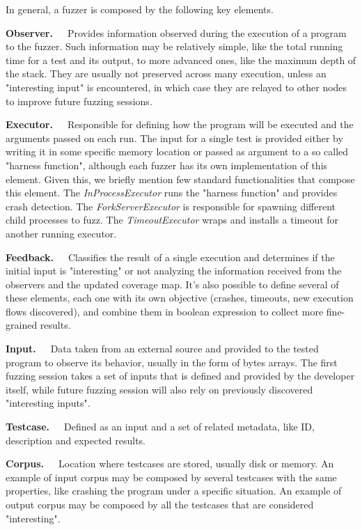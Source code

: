 In general, a fuzzer is composed by the following key elements. \cite{afl_docs}

\textbf{Observer.}\ \ \ Provides information observed during the execution of a program to the fuzzer. Such information may be relatively simple, like the total running time for a test and its output, to more advanced ones, like the maximum depth of the stack. They are usually not preserved across many execution, unless an "interesting input" is encountered, in which case they are relayed to other nodes to improve future fuzzing sessions. 

\textbf{Executor.}\ \ \ Responsible for defining how the program will be executed and the arguments passed on each run. The input for a single test is provided either by writing it in some specific memory location or passed as argument to a so called "harness function", although each fuzzer has its own implementation of this element. Given this, we briefly mention few standard functionalities that compose this element. The \textit{InProcessExecutor} runs the "harness function" and provides crash detection. The \textit{ForkServerExecutor} is responsible for spawning different child processes to fuzz. The \textit{TimeoutExecutor} wraps and installs a timeout for another running executor.

\textbf{Feedback.}\ \ \ Classifies the result of a single execution and determines if the initial input is "interesting" or not analyzing the information received from the observers and the updated coverage map. It's also possible to define several of these elements, each one with its own objective (crashes, timeouts, new execution flows discovered), and combine them in boolean expression to collect more fine-grained results.

\textbf{Input.}\ \ \ Data taken from an external source and provided to the tested program to observe its behavior, usually in the form of bytes arrays. The first fuzzing session takes a set of inputs that is defined and provided by the developer itself, while future fuzzing session will also rely on previously discovered "interesting inputs". 

\textbf{Testcase.}\ \ \ Defined as an input and a set of related metadata, like ID, description and expected results.

\textbf{Corpus.}\ \ \ Location where testcases are stored, usually disk or memory. An example of input corpus may be composed by several testcases with the same properties, like crashing the program under a specific situation. An example of output corpus may be composed by all the testcases that are considered "interesting".



